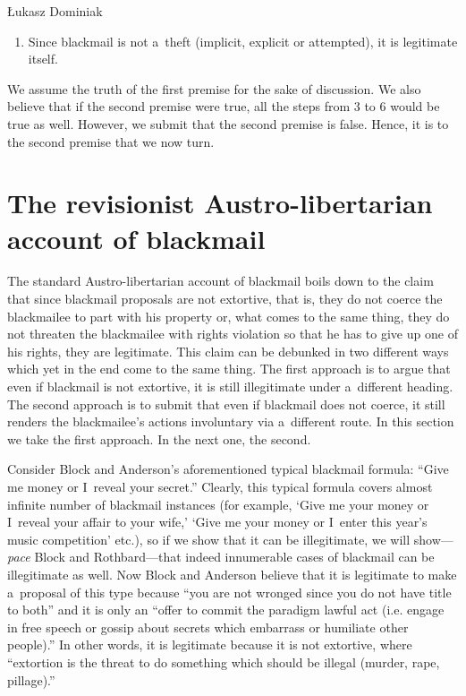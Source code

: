 \begin{artengenv}{Łukasz Dominiak}
\begin{enumerate}
\item Since blackmail is not a~theft (implicit, explicit or attempted), it is legitimate itself.

\end{enumerate}

We assume the truth of the first premise for the sake of discussion. We also believe that if the second premise were true, all the steps from 3 to 6 would be true as well. However, we submit that the second premise is false. Hence, it is to the second premise that we now turn.



\section{The revisionist Austro-libertarian account of blackmail}

The standard Austro-libertarian account of blackmail boils down to the claim that since blackmail proposals are not extortive, that is, they do not coerce the blackmailee to part with his property or, what comes to the same thing, they do not threaten the blackmailee with rights violation so that he has to give up one of his rights, they are legitimate. This claim can be debunked in two different ways which yet in the end come to the same thing. The first approach is to argue that even if blackmail is not extortive, it is still illegitimate under a~different heading. The second approach is to submit that even if blackmail does not coerce, it still renders the blackmailee's actions involuntary via a~different route. In this section we take the first approach. In the next one, the second.



Consider Block and Anderson's 
\parencite*[][p.546]{block_blackmail_2000} %
 aforementioned typical blackmail formula: ``Give me money or I~reveal your secret.'' Clearly, this typical formula covers almost infinite number of blackmail instances (for example, ‘Give me your money or I~reveal your affair to your wife,' ‘Give me your money or I~enter this year's music competition' etc.), so if we show that it can be illegitimate, we will show---\textit{pace} Block and Rothbard---that indeed innumerable cases of blackmail can be illegitimate as well. Now Block and Anderson 
\parencite*[][p.546]{block_blackmail_2000} %
 believe that it is legitimate to make a~proposal of this type because ``you are not wronged since you do not have title to both'' and it is only an ``offer to commit the paradigm lawful act (i.e. engage in free speech or gossip about secrets which embarrass or humiliate other people).'' In other words, it is legitimate because it is not extortive, where ``extortion is the threat to do something which should be illegal (murder, rape, pillage).''




\end{artengenv}
